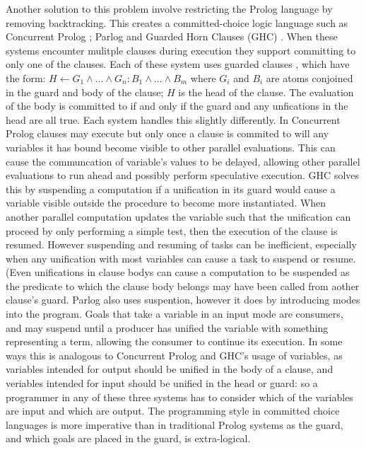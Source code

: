 Another solution to this problem involve restricting the Prolog language
by removing backtracking.
This creates a committed-choice logic language such as
Concurrent Prolog \citep{saraswat86:concurrent_prolog_definition,
shapiro:flat_concur_prolog};
Parlog \citep{clark:84:parlog_sys_prog,clark:86:parlog}
and Guarded Horn Clauses (GHC) \citep{ueda:ghc}.
When these systems encounter mulitple clauses during execution they support
committing to only one of the clauses.
Each of these system uses guarded clauses \citep{guards}, which have the
form:
$H \leftarrow G_1 \wedge \ldots \wedge G_n : B_1 \wedge \ldots \wedge B_m$
where $G_i$ and $B_i$ are atoms conjoined in the guard and body of the
clause;
$H$ is the head of the clause.
The evaluation of the body is committed to if and only if the guard and any
unfications in the head are all true.
Each system handles this slightly differently.
In Concurrent Prolog clauses may execute but only once a clause is commited
to will any variables it has bound become visible to other parallel
evaluations.
This can cause the communcation of variable's values to be delayed,
allowing other parallel evaluations to run ahead and possibly perform
speculative execution.
GHC solves this by suspending a computation if a unification in its guard
would cause a variable visible outside the procedure to become more
instantiated.
When another parallel computation updates the variable such that the
unification can proceed by only performing a simple test,
then the execution of the clause is resumed.
However suspending and resuming of tasks can be inefficient,
especially when any unification with most variables can cause a task to
suspend or resume.
(Even unifications in clause bodys can cause a computation to be suspended
as the predicate to which the clause body belongs may have been called from
aother clause's guard.
Parlog also uses suspention, however it does by introducing modes into the
program.
Goals that take a variable in an input mode are consumers, and may suspend
until a producer has unified the variable with something representing a
term, allowing the consumer to continue its execution.
In some ways this is analogous to Concurrent Prolog and GHC's usage of
variables,
as variables intended for output should be unified in the body of a clause,
and veriables intended for input should be unified in the head or guard:
so a programmer in any of these three systems has to consider which of the
variables are input and which are output.
The programming style in committed choice languages is more imperative than
in traditional Prolog systems as the guard, and which goals are placed in
the guard, is extra-logical.

